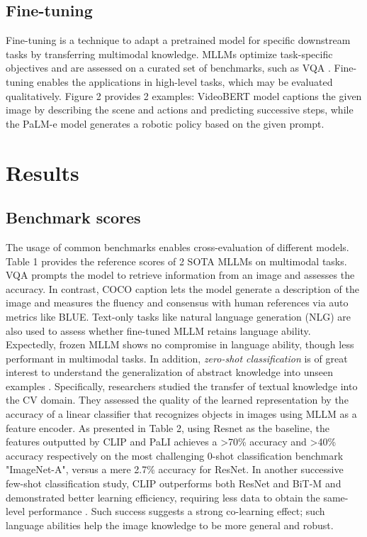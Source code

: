 \documentclass[11pt]{article}
\begin{document}
\subsection{Fine-tuning}

Fine-tuning is a technique to adapt a pretrained model for specific downstream tasks by transferring multimodal knowledge. MLLMs optimize task-specific objectives and are assessed on a curated set of benchmarks, such as VQA \citep{DBLP:journals/corr/abs-2306-13549}. Fine-tuning enables the applications in high-level tasks, which may be evaluated qualitatively. Figure 2 provides 2 examples: VideoBERT model \citep{DBLP:conf/iccv/SunMV0S19} captions the given image by describing the scene and actions and predicting successive steps, while the PaLM-e model \citep{DBLP:conf/icml/DriessXSLCIWTVY23} generates a robotic policy based on the given prompt.

\section{Results}

\subsection{Benchmark scores}


The usage of common benchmarks enables cross-evaluation of different models. Table 1 provides the reference scores of 2 SOTA MLLMs on multimodal tasks. VQA \citep{DBLP:journals/ijcv/GoyalKASBP19} prompts the model to retrieve information from an image and assesses the accuracy. In contrast, COCO caption \citep{DBLP:journals/corr/ChenFLVGDZ15} lets the model generate a description of the image and measures the fluency and consensus with human references via auto metrics like BLUE. Text-only tasks like natural language generation (NLG) are also used to assess whether fine-tuned MLLM retains language ability. Expectedly, frozen MLLM shows no compromise in language ability, though less performant in multimodal tasks. In addition, \textit{zero-shot classification} is of great interest to understand the generalization of abstract knowledge into unseen examples \citep{DBLP:conf/icml/DriessXSLCIWTVY23}. Specifically, researchers studied the transfer of textual knowledge into the CV domain. They assessed the quality of the learned representation by the accuracy of a linear classifier that recognizes objects in images using MLLM as a feature encoder. As presented in Table 2, using Resnet \citep{DBLP:journals/corr/HeZRS15} as the baseline, the features outputted by CLIP \citep{DBLP:conf/iccv/SunMV0S19} and PaLI \cite{DBLP:conf/iclr/Chen0CPPSGGMB0P23} achieves a >70\% accuracy and >40\% accuracy respectively on the most challenging 0-shot classification benchmark "ImageNet-A", versus a mere 2.7\% accuracy for ResNet. In another successive few-shot classification study, CLIP outperforms both ResNet and BiT-M \citep{DBLP:conf/eccv/KolesnikovBZPYG20} and demonstrated better learning efficiency, requiring less data to obtain the same-level performance \citep{DBLP:conf/iccv/SunMV0S19}. Such success suggests a strong co-learning effect; such language abilities help the image knowledge to be more general and robust.
\end{document}
